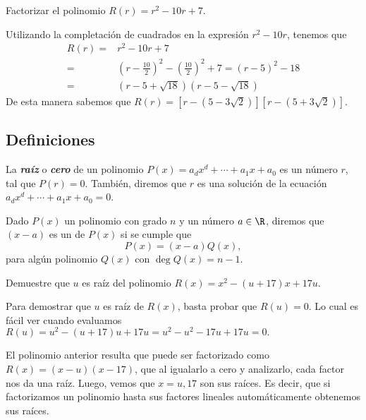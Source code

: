 \begin{example}
    Factorizar el polinomio $R(r) = r^2 - 10r + 7$.
\end{example}
\begin{solution}
    Utilizando la completación de cuadrados en la expresión $r^2 - 10r$, tenemos que
    \begin{align*}
        R(r) =& r^2 - 10r + 7\\
        =& \left( r - \frac{10}{2} \right)^2 - \left( \frac{10}{2} \right)^2 + 7
        = \left( r - 5 \right)^2 - 18\\
        =& \left( r - 5 + \sqrt {18} \right)\left( r - 5 - \sqrt {18} \right)
    \end{align*}
    De esta manera sabemos que $R(r) = \left[ r - \left( 5 - 3\sqrt {2} \right)\right]\left[ r - \left( 5 + 3\sqrt {2} \right)\right]$.
\end{solution}


\subsection{Definiciones}

\begin{definition}
    La \textbf{\emph{raíz}} o \textbf{\emph{cero}} de un polinomio $P(x) = a_d x^d + \cdots + a_1 x + a_0$ es un número $r$, tal que $P(r) = 0$.
    También, diremos que $r$ es una solución de la ecuación $ a_d x^d + \cdots + a_1 x + a_0 = 0$.
\end{definition}

\begin{definition}
    Dado $P(x)$ un polinomio con grado $n$ y un número $a \in \R$, diremos que $(x - a)$ es un  de $P(x)$ si se cumple que
    \[
        P(x) = (x - a)Q(x),
    \]
    para algún polinomio $Q(x)$ con $\deg Q(x) = n - 1$.
\end{definition}

\begin{example}
    Demuestre que $u$ es raíz del polinomio $R(x) = x^2 - (u + 17) x + 17u$.
\end{example}
\begin{solution}
    Para demostrar que $u$ es raíz de $R(x)$, basta probar que $R(u) = 0$.
    Lo cual es fácil ver cuando evaluamos $R(u) = u^2 - (u+17)u + 17u = u^2 - u^2 - 17u + 17u = 0.$
\end{solution}

El polinomio anterior resulta que puede ser factorizado como $R(x) = (x - u)(x - 17)$, que al igualarlo a cero y analizarlo, cada factor nos da una raíz.
Luego, vemos que $x = u, 17$ son sus raíces.
Es decir, que si factorizamos un polinomio hasta sus factores lineales automáticamente obtenemos sus raíces.

